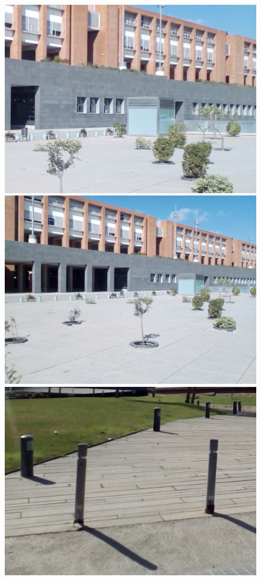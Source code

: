 		\begin{figure}[!htb]
				\includegraphics[width=\linewidth]{images/experiments/uni_2}
				\label{fig:awesome_image1}
			\endminipage\hfill
				\includegraphics[width=\linewidth]{images/experiments/uni}
				\label{fig:awesome_image2}
			\endminipage\hfill
				\includegraphics[width=\linewidth]{images/experiments/uni4_2}

\end{figure}
